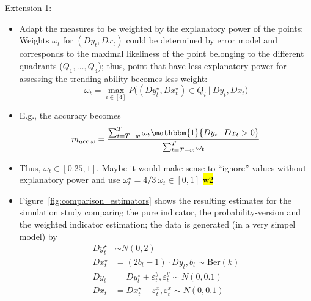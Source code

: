 \documentclass[oneside]{article}
\theoremstyle{plain}%
\theoremstyle{definition}
\newcommand{\ind}[1]{\mathbbm{1}\{#1\}}
\newcommand{\ydiff}{D y}
\newcommand{\ydifft}{Dy^\star}
\newcommand{\xdiff}{Dx}
\newcommand{\xdifft}{Dx^\star}
\newcommand{\Ber}{\text{Ber}}
\newcommand{\cond}{\:\lvert\:}
\begin{document}
Extension 1: 
\begin{itemize}
  \item 
Adapt the measures to be weighted by the explanatory power of the points:\\
Weights $\omega_t$ for $(\ydiff_t, \xdiff_t)$ could be determined by error model and corresponds to the maximal likeliness of the point belonging to the different quadrants ($Q_1, \dots, Q_4$); thus, point that have less explanatory power for assessing the trending ability becomes less weight:
 	\begin{equation}
  		\omega_t = \max_{i \in [4]} {P\big( (\ydifft_t, \xdifft_t) \in Q_i \cond \ydiff_t, \xdiff_t \big)} 
	\end{equation}
	\item E.g., the accuracy becomes
	\begin{equation}
  m_{acc, \omega} = \frac{\sum_{t=T-w}^T \omega_t \ind{\ydiff_t \cdot \xdiff_t > 0} }{\sum_{t=T-w}^T \omega_t}
\end{equation}
	\item Thus, $\omega_t \in [0.25, 1]$. Maybe it would make sense to \enquote{ignore} values without explanatory power and use $\omega_t^\star = 4/3 \ \omega_t \in [0, 1]$ \hl{w2}
	\item Figure~\ref{fig:comparison_estimators} shows the resulting estimates for the simulation study comparing the pure indicator, the probability-version and the weighted indicator estimation; the data is generated (in a very simpel model) by
	\begin{align}
		\ydifft_t &\sim N(0, 2) \\
		\xdifft_t &= (2 b_t - 1) \cdot \ydiff_t , b_t \sim \Ber (k) \\
		\ydiff_t &= \ydifft_t + \varepsilon_t^y, \varepsilon_t^y \sim N(0, 0.1) \\
		\xdiff_t &= \xdifft_t + \varepsilon_t^x, \varepsilon_t^x \sim N(0, 0.1) \\
	\end{align}
\end{itemize}
\end{document}
